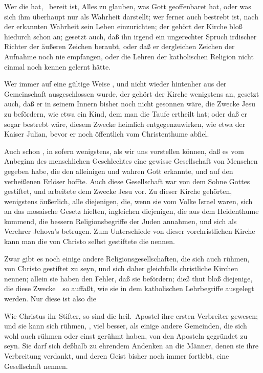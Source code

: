 \begin{aufza}
\item Wer die  hat, \dh\  bereit ist, Alles zu glauben, was Gott geoffenbaret hat, oder was sich ihm überhaupt nur als Wahrheit darstellt; wer ferner auch bestrebt ist, nach der erkannten Wahrheit sein Leben einzurichten; der gehört der Kirche bloß hiedurch schon  an; gesetzt auch, daß ihn irgend ein ungerechter Spruch irdischer Richter der äußeren Zeichen beraubt, oder daß er dergleichen Zeichen der Aufnahme noch nie empfangen, oder die Lehren der katholischen Religion nicht einmal noch kennen gelernt hätte.
\item Wer immer auf eine gültige Weise , und nicht wieder hintenher aus der Gemeinschaft ausgeschlossen wurde, der gehört der Kirche wenigstens  an, gesetzt auch, daß er in seinem Innern bisher noch nicht gesonnen wäre, die Zwecke Jesu zu befördern, wie etwa ein Kind, dem man die Taufe ertheilt hat; oder daß er sogar bestrebt wäre, diesem Zwecke heimlich entgegenzuwirken, wie etwa der Kaiser Julian, bevor er noch öffentlich vom Christenthume abfiel.
\item Auch schon , in sofern wenigstens, als wir uns vorstellen können, daß es vom Anbeginn des menschlichen Geschlechtes eine gewisse Gesellschaft von Menschen gegeben habe, die den alleinigen und wahren Gott erkannte, und auf den verheißenen Erlöser hoffte. Auch diese Gesellschaft war von dem Sohne Gottes gestiftet, und arbeitete dem Zwecke Jesu vor. Zu dieser Kirche gehörten, wenigstens äußerlich, alle diejenigen, die, wenn sie vom Volke Israel waren, sich an das mosaische Gesetz hielten, ingleichen diejenigen, die aus dem Heidenthume kommend, die bessern Religionsbegriffe der Juden annahmen, und sich als Verehrer Jehova's betrugen. Zum Unterschiede von dieser vorchristlichen Kirche kann man die von Christo selbst gestiftete die  nennen.
\item Zwar gibt es noch einige andere Religionsgesellschaften, die sich auch rühmen, von Christo gestiftet zu seyn, und sich daher gleichfalls christliche Kirchen nennen; allein sie haben den Fehler, daß sie  befördern; dieß thut bloß diejenige, die diese Zwecke~\ so auffaßt, wie sie in dem katholischen Lehrbegriffe ausgelegt werden. Nur diese ist also die 
\item Wie Christus ihr Stifter, so sind die heil.\ Apostel ihre ersten Verbreiter gewesen; und sie kann sich rühmen, , viel besser, als einige andere Gemeinden, die sich wohl auch rühmen oder einst gerühmt haben, von den Aposteln gegründet zu seyn. Sie darf sich deßhalb zu ehrendem Andenken an die Männer, denen sie ihre Verbreitung verdankt, und deren Geist bisher noch immer fortlebt, eine  Gesellschaft nennen.

\end{aufza}
